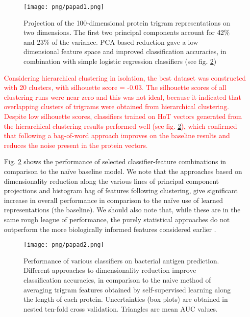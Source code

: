 \documentclass[10pt,journal,compsoc,twoside]{IEEEtran}
\begin{document}
\begin{figure}[!t]
\centering
\texttt{[image: png/papad1.png]}
\caption{Projection of the 100-dimensional protein trigram representations on two dimensions. The first two principal components account for 42\% and 23\% of the variance. PCA-based reduction gave a low dimensional feature space and improved classification accuracies, in combination with simple logistic regression classifiers (see fig. \ref{fig:fig-model-selection})}
\label{fig:fig-pca}
\end{figure}

\textcolor{red}{Considering hierarchical clustering in isolation, the best dataset was constructed with 20 clusters, with silhouette score = -0.03. The silhouette scores of all clustering runs were near zero and this was not ideal, because it indicated that overlapping clusters of trigrams were obtained from hierarchical clustering. Despite low silhouette scores, classifiers trained on HoT vectors generated from the hierarchical clustering results performed well (see fig. \ref{fig:fig-model-selection}), which confirmed that following a bag-of-word approach improves on the baseline results and reduces the noise present in the protein vectors.}

Fig. \ref{fig:fig-model-selection} shows the performance of selected classifier-feature combinations in comparison to the naïve baseline model. We note that the approaches based on dimensionality reduction along the various lines of principal component projections and histogram bag of features following clustering, give significant increase in overall performance in comparison to the naïve use of learned representations (the baseline). We should also note that, while these are in the same rough league of performance, the purely statistical approaches do not outperform the more biologically informed features considered earlier \cite{heinson_2019}.

\begin{figure}[!t]
\centering
\texttt{[image: png/papad2.png]}
\caption{Performance of various classifiers on bacterial antigen prediction. Different approaches to dimensionality reduction improve classification accuracies, in comparison to the naive method of averaging trigram features obtained by self-supervised learning along the length of each protein. Uncertainties (box plots) are obtained in nested ten-fold cross validation. Triangles are mean AUC values.}
\label{fig:fig-model-selection}
\end{figure}
\end{document}

